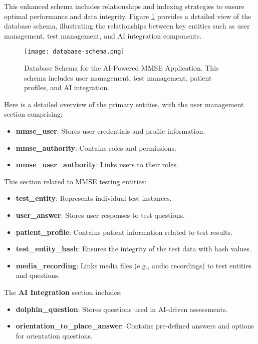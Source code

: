 This enhanced schema includes relationships and indexing strategies to ensure optimal performance and data integrity. Figure \ref{fig:database-schema} provides a detailed view of the database schema, illustrating the relationships between key entities such as user management, test management, and AI integration components.

\begin{figure}[h!]
\begin{center}
\texttt{[image: database-schema.png]}
\caption{Database Schema for the AI-Powered MMSE Application. This schema includes user management, test management, patient profiles, and AI integration.}
\label{fig:database-schema}
\end{center}
\end{figure}

Here is a detailed overview of the primary entities, with the user management section comprising:
\begin{itemize}
    \item \textbf{mmse\_user}: Stores user credentials and profile information.
    \item \textbf{mmse\_authority}: Contains roles and permissions.
    \item \textbf{mmse\_user\_authority}: Links users to their roles.
\end{itemize}

This section related to MMSE testing entities:
\begin{itemize}
    \item \textbf{test\_entity}: Represents individual test instances.
    \item \textbf{user\_answer}: Stores user responses to test questions.
    \item \textbf{patient\_profile}: Contains patient information related to test results.
    \item \textbf{test\_entity\_hash}: Ensures the integrity of the test data with hash values.
    \item \textbf{media\_recording}: Links media files (e.g., audio recordings) to test entities and questions.
\end{itemize}

The \textbf{AI Integration} section includes:
\begin{itemize}
    \item \textbf{dolphin\_question}: Stores questions used in AI-driven assessments.
    \item \textbf{orientation\_to\_place\_answer}: Contains pre-defined answers and options for orientation questions.
\end{itemize}

